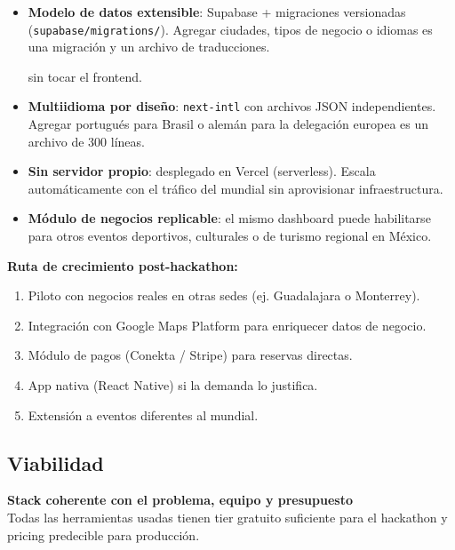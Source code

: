 \documentclass[11pt,a4paper]{article}
\newcommand{\criterio}[2]{
  \vspace{0.3cm}
  \noindent\colorbox{primary!10}{\parbox{\dimexpr\linewidth-2\fboxsep}{%
    \textbf{\textcolor{primary}{#1}}\\[2pt]
    \small\textcolor{dark}{#2}
  }}
  \vspace{0.3cm}
}
\newcommand{\tech}[1]{\texttt{\textcolor{primary}{#1}}}
\begin{document}
\begin{itemize}[leftmargin=*, itemsep=2pt]
  \item \textbf{Modelo de datos extensible}: Supabase + migraciones versionadas
        (\tech{supabase/migrations/}). Agregar ciudades, tipos de negocio o
        idiomas es una migración y un archivo de traducciones.

        sin tocar el frontend.
  \item \textbf{Multiidioma por diseño}: \tech{next-intl} con archivos JSON
        independientes. Agregar portugués para Brasil o alemán para la delegación
        europea es un archivo de 300 líneas.
  \item \textbf{Sin servidor propio}: desplegado en Vercel (serverless). Escala
        automáticamente con el tráfico del mundial sin aprovisionar
        infraestructura.
  \item \textbf{Módulo de negocios replicable}: el mismo dashboard puede
        habilitarse para otros eventos deportivos, culturales o de turismo
        regional en México.
\end{itemize}

\textbf{Ruta de crecimiento post-hackathon:}
\begin{enumerate}[leftmargin=*, itemsep=1pt]
  \item Piloto con negocios reales en otras sedes (ej. Guadalajara o Monterrey).
  \item Integración con Google Maps Platform para enriquecer datos de negocio.
  \item Módulo de pagos (Conekta / Stripe) para reservas directas.
  \item App nativa (React Native) si la demanda lo justifica.
  \item Extensión a eventos diferentes al mundial.
\end{enumerate}

\subsection{Viabilidad}

\criterio{Stack coherente con el problema, equipo y presupuesto}
{Todas las herramientas usadas tienen tier gratuito suficiente para el
hackathon y pricing predecible para producción.}
\end{document}
